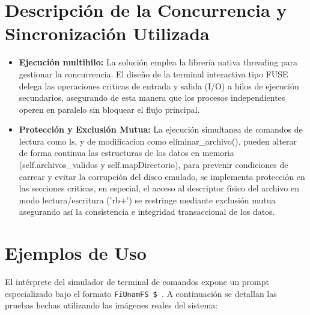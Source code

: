 \documentclass[11pt,a4paper]{article}
\begin{document}
\section{Descripción de la Concurrencia y Sincronización Utilizada}
\begin{itemize}
    \item \textbf{Ejecución multihilo:} La solución emplea la librería nativa threading para gestionar la concurrencia. El diseño de la terminal interactiva tipo FUSE delega las operaciones criticas de entrada y salida (I/O) a hilos de ejecución secundarios, asegurando de esta manera que los procesos independientes operen en paralelo sin bloquear el flujo principal.
    \item \textbf{Protección y Exclusión Mutua:} La ejecución simultanea de comandos de lectura como ls, y de modificacion como eliminar_archivo(), pueden alterar de forma continua las estructuras de los datos en memoria (self.archivos\_validos y self.mapDirectorio), para prevenir condiciones de carrear y evitar la corrupción del disco emulado, se implementa protección en las secciones criticas, en especial, el acceso al descriptor físico del archivo en modo lectura/escritura ('rb+') se restringe mediante exclusión mutua asegurando así la consistencia e integridad transaccional de los datos.
\end{itemize}

\section{Ejemplos de Uso}
El intérprete del simulador de terminal de comandos expone un prompt especializado bajo el formato \texttt{FiUnamFS \$ }. A continuación se detallan las pruebas hechas utilizando las imágenes reales del sistema:
\end{document}
